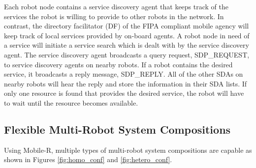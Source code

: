       Each robot node contains a service discovery agent that keeps track of the 
        services the robot is willing to provide to other robots in the network.
      In contrast, the directory facilitator (DF) of the FIPA compliant mobile 
        agency will keep track of local services provided by on-board agents.
      A robot node in need of a service will initiate a service search which is
        dealt with by the service discovery agent.
      The service discovery agent broadcasts a query request, SDP\_REQUEST, to 
        service discovery agents on nearby robots.
      If a robot contains the desired service, it broadcasts a reply message,
        SDP\_REPLY.
      All of the other SDAs on nearby robots will hear the reply and store the
        information in their SDA lists.
      If only one resource is found that provides the desired service, the robot
        will have to wait until the resource becomes available.


  \subsection{Flexible Multi-Robot System Compositions}
    Using Mobile-R, multiple types of multi-robot system compositions are 
      capable as shown in Figures \ref{fig:homo_conf} and \ref{fig:hetero_conf}.


